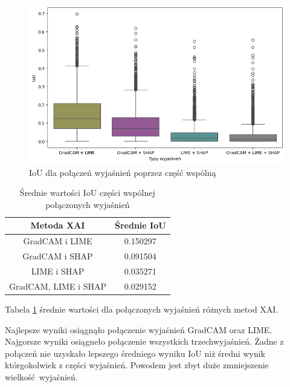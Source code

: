 \begin{figure}[h]
	\centering\includegraphics[width=.9\textwidth]{img/combine_iou_and}
	\caption{IoU dla połączeń wyjaśnień poprzez część wspólną}  \label{rys:combine_iou_and}
\end{figure}
\begin{table}[h]
	\centering
	\begin{tabular}{|c|c|}
		\hline
		\textbf{Metoda XAI}  & Średnie IoU \\
		\hline
		GradCAM i LIME       & 0.150297    \\
		\hline
		GradCAM i SHAP       & 0.091504    \\
		\hline
		LIME i SHAP          & 0.035271    \\
		\hline
		GradCAM, LIME i SHAP & 0.029152    \\
		\hline
	\end{tabular}
	\caption{Średnie wartości IoU części wspólnej połączonych wyjaśnień}
	\label{tab:combineandiouand}
\end{table}
Tabela \ref{tab:combineandiouand} średnie wartości dla połączonych wyjaśnień różnych metod XAI.

Najlepsze wyniki osiągnąło połączenie wyjaśnień GradCAM oraz LIME.
Najgorsze wyniki osiągneło połączenie wszystkich trzechwyjaśnień.
Żadne z połączeń nie uzyskało lepszego średniego wyniku  IoU niż średni wynik którgokolwiek z części wyjaśnień.
Powodem jest zbyt duże zmniejszenie wielkość wyjaśnień.

\vspace{1cm}

